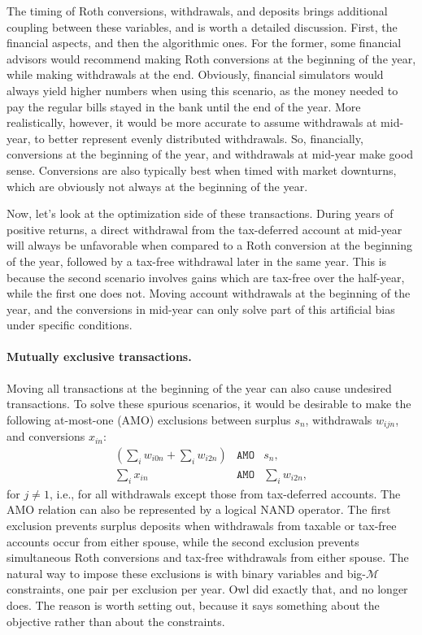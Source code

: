 \documentclass[fleqn,12pt]{report}
\begin{document}
	The timing of Roth conversions, withdrawals, and deposits brings
	additional coupling between these variables, and is worth a detailed discussion.
	First, the financial aspects, and then the algorithmic ones.
	For the former, some financial advisors would recommend making Roth
	conversions at the beginning of the year, while making withdrawals
	at the end. Obviously, financial simulators would always yield higher numbers
	when using this scenario, as the money needed to pay the regular bills 
	stayed in the bank until the end of the year. More realistically,
	however, it would be more accurate to assume withdrawals at mid-year,
	to better represent evenly distributed withdrawals. So, financially,
	conversions at the beginning of the year, and withdrawals at mid-year
	make good sense. Conversions are also typically best when
	timed with market downturns, which are obviously not always at the
	beginning of the year.

	Now, let's look at the optimization side of these transactions.
	During years of positive returns,
	a direct withdrawal from the tax-deferred account at mid-year will always
	be unfavorable when compared to a Roth conversion
	at the beginning of the year, followed
	by a tax-free withdrawal later in the same year.
	This is because the second
	scenario involves gains which are tax-free over the half-year, while
	the first one does not. Moving account withdrawals at the beginning
	of the year, and the conversions in mid-year can only solve part of this artificial bias
	under specific conditions.

\paragraph*{Mutually exclusive transactions.}
\label{Sec:AMO}
	Moving all transactions at the beginning of the year can also cause undesired transactions. 
	To solve these spurious scenarios, it would be desirable to make the following at-most-one
	(AMO) exclusions between surplus $s_n$, withdrawals $w_{ijn}$, and conversions $x_{in}$:
	\begin{eqnarray*}
		\left(\sum_i w_{i0n} + \sum_i w_{i2n}\right) &\texttt{AMO} & s_n, \\
		\sum_i x_{in} &\texttt{AMO} & \sum_i w_{i2n},
	\end{eqnarray*}
	for $j \neq 1$, i.e., for all withdrawals except those from tax-deferred accounts.
	The AMO relation can also be represented by a logical NAND operator.
	The first exclusion prevents surplus deposits when withdrawals from taxable or tax-free accounts occur
	from either spouse, while the second exclusion prevents simultaneous Roth conversions and tax-free withdrawals
	from either spouse.
	The natural way to impose these exclusions is with binary variables and big-$\mathcal{M}$
	constraints, one pair per exclusion per year. Owl did exactly that, and no longer does.
	The reason is worth setting out, because it says something about the objective rather
	than about the constraints.
\end{document}
